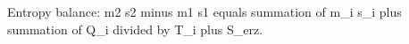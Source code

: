 Entropy balance:  
m2 s2 minus m1 s1 equals summation of m_i s_i plus summation of Q_i divided by T_i plus S_erz.